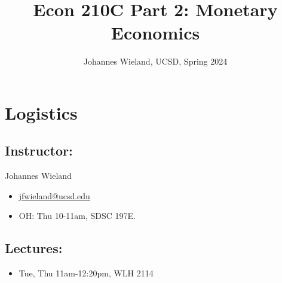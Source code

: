 \documentclass[12pt]{article}
\title{Econ 210C Part 2: Monetary Economics}
\author{Johannes Wieland, UCSD, Spring 2024}
\date{}
\begin{document}
\maketitle
\singlespacing

\section*{Logistics}

\subsection*{Instructor:}
Johannes Wieland
\begin{itemize}
	\item \href{jfwieland@ucsd.edu}{jfwieland@ucsd.edu}
	\item OH: Thu 10-11am, SDSC 197E.
\end{itemize}


\subsection*{Lectures:}

\begin{itemize}
	\item Tue, Thu 11am-12:20pm, WLH 2114
\end{itemize}

%
\end{document}
